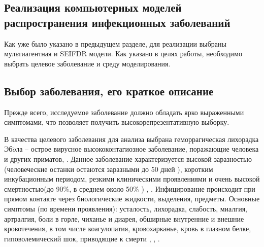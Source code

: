 \newpage
\parindent=1cm %
\begin{center}
		
		\section{Реализация компьютерных моделей распространения инфекционных заболеваний}
		
\end{center}


Как уже было указано  в предыдущем разделе, для реализации выбраны мультиагентная и SEIFDR модели. Как указано в целях работы, необходимо выбрать целевое заболевание и среду моделирования.

\subsection{Выбор заболевания, его краткое описание}
Прежде всего, исследуемое заболевание должно обладать ярко выраженными симптомами, что позволяет получить высокорепрезентативную  выборку.


В качества целевого заболевания для анализа выбрана геморрагическая лихорадка Эб$\acute{o}$ла -- острое вирусное высококонтагиозное заболевание, поражающие человека и других приматов, . Данное заболевание характеризуется высокой заразностью (человеческие останки остаются заразными до 50 дней 
\cite{CDC:2014:1}), коротким инкубационным периодом, резкими клиническими проявлениями и очень высокой смертностью(до 90\%, в среднем около 50\% ) \cite{WHO:2018:1}, \cite[с. 444]{Sunit:2014}. %
Инфицирование происходит при прямом контакте через биологические жидкости, выделения, предметы. Основные симптомы (по времени проявления):  усталость, лихорадка, слабость, миалгия,  артралгия, боли в горле, чиханье и диарея,  обширные внутренние и внешние кровотечения, в том числе коагулопатия, кровохарканье, кровь в глазном белке, гиповолемический шок, приводящие к смерти \cite{ncbi:2011}, \cite{ovid:2016}, \cite{Springer:2015}  . 

